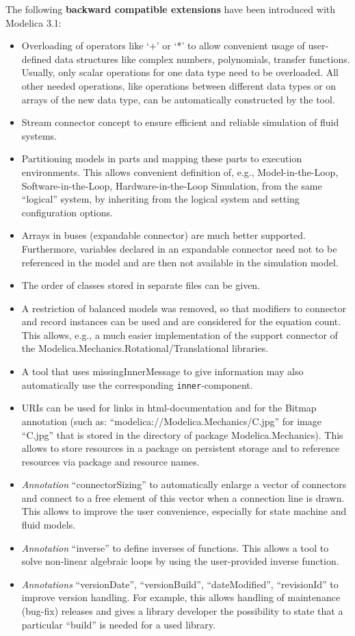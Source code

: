 The following \textbf{backward compatible extensions} have been
introduced with Modelica 3.1:

\begin{itemize}
\item
  Overloading of operators like `+' or `*' to allow convenient usage of
  user-defined data structures like complex numbers, polynomials,
  transfer functions. Usually, only scalar operations for one data type
  need to be overloaded. All other needed operations, like operations
  between different data types or on arrays of the new data type, can be
  automatically constructed by the tool.
\item
  Stream connector concept to ensure efficient and reliable simulation
  of fluid systems.
\item
  Partitioning models in parts and mapping these parts to execution
  environments. This allows convenient definition of, e.g.,
  Model-in-the-Loop, Software-in-the-Loop, Hardware-in-the-Loop
  Simulation, from the same ``logical'' system, by inheriting from the
  logical system and setting configuration options.
\item
  Arrays in buses (expandable connector) are much better supported.
  Furthermore, variables declared in an expandable connector need not to
  be referenced in the model and are then not available in the
  simulation model.
\item
  The order of classes stored in separate files can be given.
\item
  A restriction of balanced models was removed, so that modifiers to
  connector and record instances can be used and are considered for the
  equation count. This allows, e.g., a much easier implementation of the
  support connector of the Modelica.Mechanics.Rotational/Translational
  libraries.
\item
  A tool that uses missingInnerMessage to give information may also
  automatically use the corresponding \lstinline!inner!-component.
\item
  URIs can be used for links in html-documentation and for the Bitmap
  annotation (such as: ``modelica://Modelica.Mechanics/C.jpg'' for image
  ``C.jpg'' that is stored in the directory of package
  Modelica.Mechanics). This allows to store resources in a package on
  persistent storage and to reference resources via package and resource
  names.
\item
  \emph{Annotation} ``connectorSizing'' to automatically enlarge a
  vector of connectors and connect to a free element of this vector when
  a connection line is drawn. This allows to improve the user
  convenience, especially for state machine and fluid models.
\item
  \emph{Annotation} ``inverse'' to define inverses of functions. This
  allows a tool to solve non-linear algebraic loops by using the
  user-provided inverse function.
\item
  \emph{Annotations} ``versionDate'', ``versionBuild'',
  ``dateModified'', ``revisionId'' to improve version handling. For
  example, this allows handling of maintenance (bug-fix) releases and
  gives a library developer the possibility to state that a particular
  ``build'' is needed for a used library.
\end{itemize}
